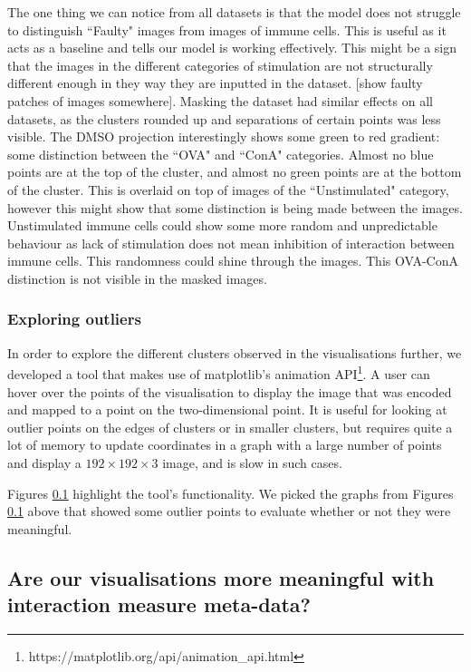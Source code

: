 The one thing we can notice from all datasets is that the model does not struggle to distinguish ``Faulty" images from images of immune cells. This is useful as it acts as a baseline and tells our model is working effectively. This might be a sign that the images in the different categories of stimulation are not structurally different enough in they way they are inputted in the dataset. [show faulty patches of images somewhere].
Masking the dataset had similar effects on all datasets, as the clusters rounded up and separations of certain points was less visible. The DMSO projection interestingly shows some green to red gradient: some distinction between the ``OVA" and ``ConA" categories. Almost no blue points are at the top of the cluster, and almost no green points are at the bottom of the cluster. This is overlaid on top of images of the ``Unstimulated" category, however this might show that some distinction is being made between the images. Unstimulated immune cells could show some more random and unpredictable behaviour as lack of stimulation does not mean inhibition of interaction between immune cells. This randomness could shine through the images. This OVA-ConA distinction is not visible in the masked images.

\bigskip
\subsubsection{Exploring outliers}
\hfill
\hfill

In order to explore the different clusters observed in the visualisations further, we developed a tool that makes use of matplotlib's animation API\footnote{https://matplotlib.org/api/animation\_api.html}. A user can hover over the points of the visualisation to display the image that was encoded and mapped to a point on the two-dimensional point. It is useful for looking at outlier points on the edges of clusters or in smaller clusters, but requires quite a lot of memory to update coordinates in a graph with a large number of points and display a $192\times192\times3$ image, and is slow in such cases.

Figures \ref{} highlight the tool's functionality. We picked the graphs from Figures \ref{} above that showed some outlier points to evaluate whether or not they were meaningful.

\subsection{Are our visualisations more meaningful with interaction measure meta-data?}

